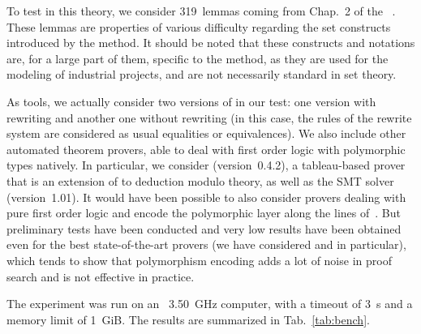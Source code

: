 To test \archsat{} in this theory, we consider 319~lemmas coming from Chap.~2 of
the \bbook{}~\cite{B-Book}. These lemmas are properties of various difficulty
regarding the set constructs introduced by the \bmth{} method. It should be
noted that these constructs and notations are, for a large part of them,
specific to the \bmth{} method, as they are used for the modeling of industrial
projects, and are not necessarily standard in set theory.

As tools, we actually consider two versions of \archsat{} in our test: one
version with rewriting and another one without rewriting (in this case, the
rules of the rewrite system are considered as usual equalities or
equivalences). We also include other automated theorem provers, able to deal
with first order logic with polymorphic types natively. In particular, we
consider \zenm{} (version~0.4.2), a tableau-based prover that is an extension of
\zenon{} to deduction modulo theory, as well as the \altergo{} SMT solver
(version~1.01). It would have been possible to also consider provers dealing
with pure first order logic and encode the polymorphic layer along the lines
of~\cite{BA13}. But preliminary tests have been conducted and very low results
have been obtained even for the best state-of-the-art provers (we have
considered \e{} and \cvc{} in particular), which tends to show that polymorphism
encoding adds a lot of noise in proof search and is not effective in practice.

The experiment was run on an \intel{}~3.50~GHz computer, with a timeout of 3~s
and a memory limit of 1~GiB. The results are summarized in Tab.~\ref{tab:bench}.

\setlength{\tabcolsep}{3pt}
\renewcommand{\arraystretch}{1.2}

